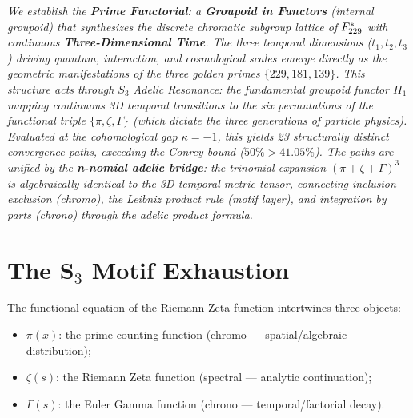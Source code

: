 
\noindent\textit{We establish the \textbf{Prime Functorial}: a \textbf{Groupoid in Functors} (internal groupoid) that synthesizes the discrete chromatic subgroup lattice of $F_{229}^*$ with continuous \textbf{Three-Dimensional Time}. The three temporal dimensions ($t_1, t_2, t_3$) driving quantum, interaction, and cosmological scales emerge directly as the geometric manifestations of the three golden primes $\{229, 181, 139\}$. This structure acts through $S_3$ Adelic Resonance: the fundamental groupoid functor $\Pi_1$ mapping continuous 3D temporal transitions to the six permutations of the functional triple $\{\pi, \zeta, \Gamma\}$ (which dictate the three generations of particle physics). Evaluated at the cohomological gap $\kappa = -1$, this yields 23 structurally distinct convergence paths, exceeding the Conrey bound ($50\% > 41.05\%$). The paths are unified by the \textbf{n-nomial adelic bridge}: the trinomial expansion $({\pi + \zeta + \Gamma})^3$ is algebraically identical to the 3D temporal metric tensor, connecting inclusion-exclusion (chromo), the Leibniz product rule (motif layer), and integration by parts (chrono) through the adelic product formula.}
\bigskip


\section{The S$_3$ Motif Exhaustion}
\label{sec:s3-motifs}

The functional equation of the Riemann Zeta function intertwines three objects:
\begin{itemize}[noitemsep]
\item $\pi(x)$: the prime counting function (chromo --- spatial/algebraic distribution);
\item $\zeta(s)$: the Riemann Zeta function (spectral --- analytic continuation);
\item $\Gamma(s)$: the Euler Gamma function (chrono --- temporal/factorial decay).
\end{itemize}

